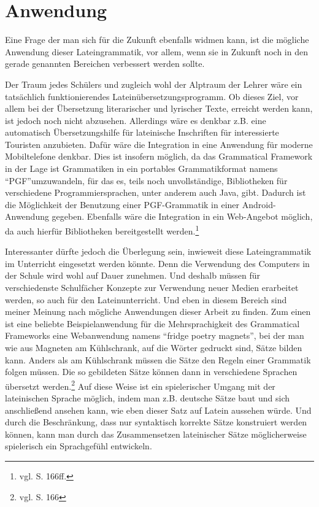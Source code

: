 \section{Anwendung}
Eine Frage der man sich für die Zukunft ebenfalls widmen kann, ist die mögliche Anwendung dieser Lateingrammatik, vor allem, wenn sie in Zukunft noch in den gerade genannten Bereichen verbessert werden sollte. \par
Der Traum jedes Schülers und zugleich wohl der Alptraum der Lehrer wäre ein tatsächlich funktionierendes Lateinübersetzungsprogramm. Ob dieses Ziel, vor allem bei der Übersetzung literarischer und lyrischer Texte, erreicht werden kann, ist jedoch noch nicht abzusehen. Allerdings wäre es denkbar z.B. eine automatisch Übersetzungshilfe für lateinische Inschriften für interessierte Touristen anzubieten. Dafür wäre die Integration in eine Anwendung für moderne Mobiltelefone denkbar. Dies ist insofern möglich, da das Grammatical Framework in der Lage ist Grammatiken in ein portables Grammatikformat namens "`PGF"'umzuwandeln, für das es, teils noch unvollständige, Bibliotheken für verschiedene Programmiersprachen, unter anderem auch Java, gibt. Dadurch ist die Möglichkeit der Benutzung einer PGF-Grammatik in einer Android-Anwendung gegeben. Ebenfalls wäre die Integration in ein Web-Angebot möglich, da auch hierfür Bibliotheken bereitgestellt werden.\footnote{vgl. \cite{RANTA2011} S. 166ff.} \par
Interessanter dürfte jedoch die Überlegung sein, inwieweit diese Lateingrammatik im Unterricht eingesetzt werden könnte. Denn die Verwendung des Computers in der Schule wird wohl auf Dauer zunehmen. Und deshalb müssen für verschiedenste Schulfächer Konzepte zur Verwendung neuer Medien erarbeitet werden, so auch für den Lateinunterricht. Und eben in diesem Bereich sind meiner Meinung nach mögliche Anwendungen dieser Arbeit zu finden. Zum einen ist eine beliebte Beispielanwendung für die Mehrsprachigkeit des Grammatical Frameworks eine Webanwendung namens "`fridge poetry magnets"', bei der man wie aus Magneten am Kühlschrank, auf die Wörter gedruckt sind, Sätze bilden kann. Anders als am Kühlschrank müssen die Sätze den Regeln einer Grammatik folgen müssen. Die so gebildeten Sätze können dann in verschiedene Sprachen übersetzt werden.\footnote{vgl. \cite{RANTA2011} S. 166} Auf diese Weise ist ein spielerischer Umgang mit der lateinischen Sprache möglich, indem man z.B. deutsche Sätze baut und sich anschließend ansehen kann, wie eben dieser Satz auf Latein aussehen würde. Und durch die Beschränkung, dass nur syntaktisch korrekte Sätze konstruiert werden können, kann man durch das Zusammensetzen lateinischer Sätze möglicherweise spielerisch ein Sprachgefühl entwickeln. \par

